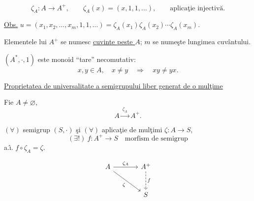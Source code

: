 \noindent
\[
\zeta_A:A\longrightarrow A^{+},\qquad
\zeta_A(x)=(x,1,1,\ldots),\qquad\text{aplica\c{t}ie injectiv\u{a}}.
\]

\medskip
\noindent\underline{Obs.}\quad
$u=(x_1,x_2,\ldots,x_m,1,1,\ldots)
=\zeta_A(x_1)\zeta_A(x_2)\cdots\zeta_A(x_m)$.

\medskip
\noindent Elementele lui $A^{+}$ se numesc \underline{cuvinte peste $A$};
$m$ se nume\c{s}te lungimea cuv\^{a}ntului.

\bigskip
\noindent $(A^{*},\cdot,1)$ este monoid ``tare'' necomutativ:
\[
x,y\in A,\quad x\neq y\quad\Longrightarrow\quad xy\neq yx.
\]

\bigskip
\noindent{}\quad
\underline{Proprietatea de universalitate a semigrupului liber generat de o mul\c{t}ime}

\medskip
\noindent Fie $A\neq\varnothing$,
\[A\xrightarrow{\ \zeta_A\ } A^{+}.\]

\noindent $(\forall)$ semigrup $(S,\cdot)$ \c{s}i
$(\forall)$ aplica\c{t}ie de mul\c{t}imi $\zeta:A\longrightarrow S$,
\[
(\exists!)\ f:A^{+}\longrightarrow S\quad\text{morfism de semigrup}
\]
\noindent a.\^{\i}. $f\circ\zeta_A=\zeta$.

\[
\begin{tikzcd}[column sep=large,row sep=large]
A \arrow[r,"\zeta_A"] \arrow[dr,"\zeta"'] & A^{+} \arrow[d,dashed,"f"] \\
& S
\end{tikzcd}
\]
